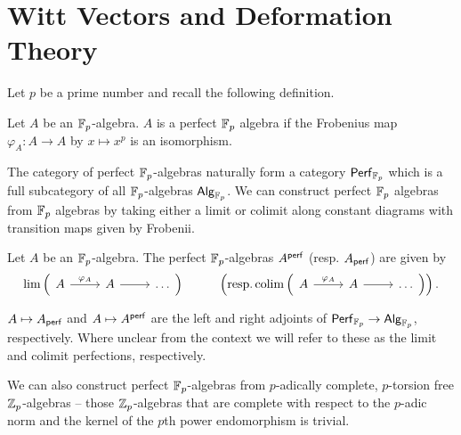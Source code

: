 \section{Witt Vectors and Deformation Theory}\label{sec: Witt vectors}
Let $p$ be a prime number and recall the following definition. 
\begin{definition}\label{def: perfeft Fp algebra}
    Let $A$ be an $\mathbb{F}_{p}$-algebra. $A$ is a perfect $\mathbb{F}_{p}$ algebra if the Frobenius map $\varphi_{A}:A\to A$ by $x\mapsto x^{p}$ is an isomorphism. 
\end{definition}
The category of perfect $\mathbb{F}_{p}$-algebras naturally form a category $\mathsf{Perf}_{\mathbb{F}_{p}}$ which is a full subcategory of all $\mathbb{F}_{p}$-algebras $\mathsf{Alg}_{\mathbb{F}_{p}}$. We can construct perfect $\mathbb{F}_{p}$ algebras from $\mathbb{F}_{p}$ algebras by taking either a limit or colimit along constant diagrams with transition maps given by Frobenii. 
\begin{definition}[Perfection]\label{def: perfection}
    Let $A$ be an $\mathbb{F}_{p}$-algebra. The perfect $\mathbb{F}_{p}$-algebras $A^{\mathsf{perf}}$ (resp. $A_{\mathsf{perf}}$) are given by
    $$\lim\left(%
    \begin{tikzcd}
        A & A & \dots
        \arrow["{\varphi_{A}}", from=1-1, to=1-2]
        \arrow[from=1-2, to=1-3]
    \end{tikzcd}\right)\hspace{1cm}\left(\text{resp.}\colim\left(%
    \begin{tikzcd}
        A & A & \dots
        \arrow["{\varphi_{A}}", from=1-1, to=1-2]
        \arrow[from=1-2, to=1-3]
    \end{tikzcd}\right)\right).$$
\end{definition}
\begin{remark}
    $A\mapsto A_{\mathsf{perf}}$ and $A\mapsto A^{\mathsf{perf}}$ are the left and right adjoints of $\mathsf{Perf}_{\mathbb{F}_{p}}\to\mathsf{Alg}_{\mathbb{F}_{p}}$, respectively. Where unclear from the context we will refer to these as the limit and colimit perfections, respectively. 
\end{remark}
We can also construct perfect $\mathbb{F}_{p}$-algebras from $p$-adically complete, $p$-torsion free $\mathbb{Z}_{p}$-algebras -- those $\mathbb{Z}_{p}$-algebras that are complete with respect to the $p$-adic norm and the kernel of the $p$th power endomorphism is trivial.
